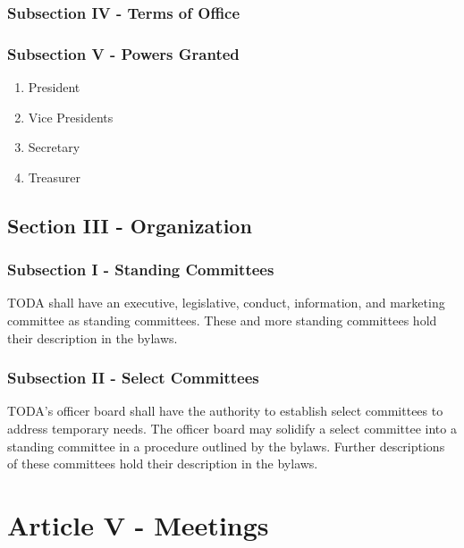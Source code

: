 \documentclass[11pt]{article}
\begin{document}
\subsubsection{Subsection IV - Terms of Office}
\label{sec:org9f667fe}

\subsubsection{Subsection V - Powers Granted}
\label{sec:org24e9f6e}

\begin{enumerate}
\item President
\label{sec:org43680b1}

\item Vice Presidents
\label{sec:org9092c57}

\item Secretary
\label{sec:org42938f5}

\item Treasurer
\label{sec:org94c2826}
\end{enumerate}

\subsection{Section III - Organization}
\label{sec:orgaa26b4b}

\subsubsection{Subsection I - Standing Committees}
\label{sec:org43eddf0}

TODA shall have an executive, legislative, conduct, information, and marketing committee as standing committees. 
These and more standing committees hold their description in the bylaws.

\subsubsection{Subsection II - Select Committees}
\label{sec:org42ec733}

TODA's officer board shall have the authority to establish select committees to address temporary needs.
The officer board may solidify a select committee into a standing committee in a procedure outlined by the bylaws.
Further descriptions of these committees hold their description in the bylaws.

\section{Article V - Meetings}
\label{sec:orgded0720}
\end{document}
